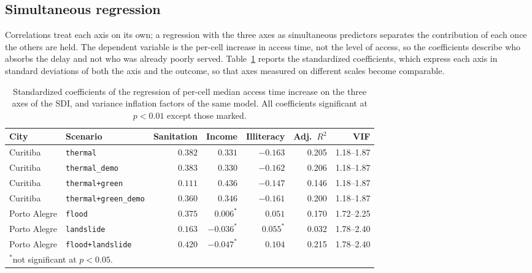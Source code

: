 \subsection{Simultaneous regression}
\label{subsec:results-regression}

Correlations treat each axis on its own; a regression with the three axes as simultaneous predictors separates the contribution of each once the others are held. The dependent variable is the per-cell increase in access time, not the level of access, so the coefficients describe who absorbs the delay and not who was already poorly served. Table~\ref{tab:results-regression} reports the standardized coefficients, which express each axis in standard deviations of both the axis and the outcome, so that axes measured on different scales become comparable.

\begin{table}[htbp]
\centering
\caption{Standardized coefficients of the regression of per-cell median access time increase on the three axes of the SDI, and variance inflation factors of the same model. All coefficients significant at $p < 0.01$ except those marked.}
\label{tab:results-regression}
\footnotesize
\begin{tabular}{llrrrrr}
\hline
City & Scenario & Sanitation & Income & Illiteracy & Adj.\ $R^2$ & VIF \\
\hline
Curitiba & \texttt{thermal} & $0.382$ & $0.331$ & $-0.163$ & 0.205 & 1.18--1.87 \\
Curitiba & \texttt{thermal\_demo} & $0.383$ & $0.330$ & $-0.162$ & 0.206 & 1.18--1.87 \\
Curitiba & \texttt{thermal+green} & $0.111$ & $0.436$ & $-0.147$ & 0.146 & 1.18--1.87 \\
Curitiba & \texttt{thermal+green\_demo} & $0.360$ & $0.346$ & $-0.161$ & 0.200 & 1.18--1.87 \\
Porto Alegre & \texttt{flood} & $0.375$ & $0.006^{*}$ & $0.051$ & 0.170 & 1.72--2.25 \\
Porto Alegre & \texttt{landslide} & $0.163$ & $-0.036^{*}$ & $0.055^{*}$ & 0.032 & 1.78--2.40 \\
Porto Alegre & \texttt{flood+landslide} & $0.420$ & $-0.047^{*}$ & $0.104$ & 0.215 & 1.78--2.40 \\
\hline
\multicolumn{7}{l}{\footnotesize $^{*}$not significant at $p < 0.05$.} \\
\end{tabular}
\end{table}

